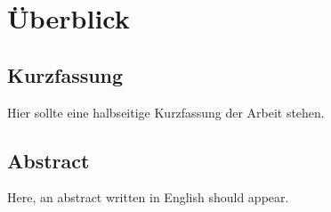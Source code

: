\chapter*{Überblick}
\section*{Kurzfassung}
Hier sollte eine halbseitige Kurzfassung der Arbeit stehen.
\vfill\vfill\vfill\vfill\vfill\vfill
\section*{Abstract}
Here, an abstract written in English should appear.
\vfill\vfill\vfill\vfill\vfill\vfill
